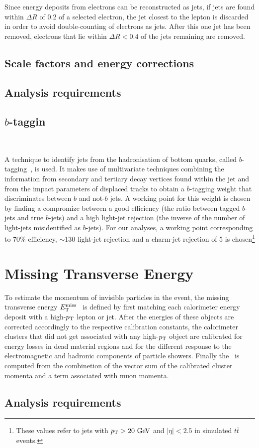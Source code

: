 Since energy deposits from electrons can be reconstructed as jets, 
if jets are found within $\Delta R$ of 0.2 of a selected electron, the
jet closest to the lepton is discarded in order to avoid double-counting of electrons as jets.
After this one jet has been removed, electrons that lie within $\Delta R< 0.4$ of 
the jets remaining are removed.

\subsection{Scale factors and energy corrections}

\subsection{Analysis requirements}


\subsection{$b$-taggin}~\label{sec:btagging}

A technique to identify jets from the hadronisation of bottom quarks, 
called $b$-tagging~\cite{ref:ATLAS-CONF-2011-102}, is used. It
makes use of multivariate techniques combining the information
from secondary and tertiary decay vertices found within the jet
and from the impact parameters of displaced tracks to obtain a 
$b$-tagging weight that discriminates between $b$ and not-$b$
jets. A working point for this weight is chosen by finding
a compromize between a good efficiency (the ratio between tagged 
$b$-jets and true $b$-jets) and a high light-jet rejection
(the inverse of the number of light-jets misidentified as $b$-jets).
For our analyses, a working point corresponding to  70\% efficiency, 
$\sim$130 light-jet rejection and a charm-jet rejection of 5 is 
chosen\footnote{These values refer to jets with $\pt >20\gev$ and 
$|\eta|<2.5$ in simulated $t\bar{t}$ events.}


\section{Missing Transverse Energy}\label{sec:met}

To estimate the momentum of invisible particles in the event,
the missing transverse energy $\met$~\cite{met} is defined by first matching each calorimeter energy 
deposit with a high-$\pt$ lepton or jet. After the energies of these objects are
corrected accordingly to the respective calibration constants, the calorimeter clusters
that did not get associated with any  high-$\pt$ object are calibrated for energy losses in 
dead material regions and for the different response to the electromagnetic and hadronic
components of particle showers. Finally the \met\ is computed from the combinetion of the vector 
sum of the calibrated cluster momenta and a term associated with muon momenta.


\subsection{Analysis requirements}
